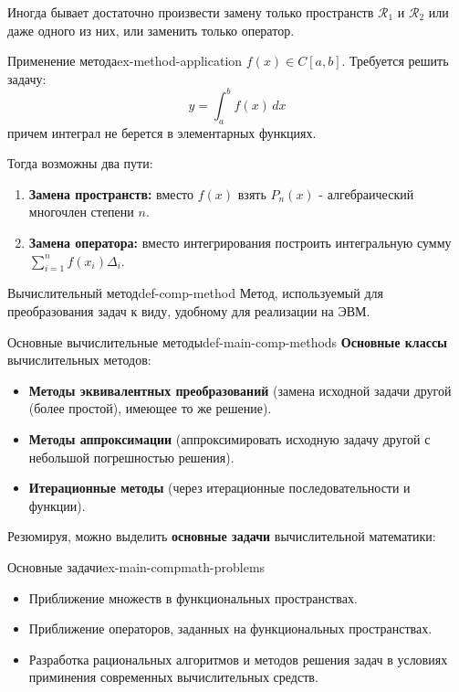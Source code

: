 \documentclass[14pt]{extarticle}
\begin{document}
        Иногда бывает достаточно произвести замену только пространств $\mathscr{R}_{1}$ и $\mathscr{R}_{2}$ или даже одного из них, или заменить только оператор.

        \begin{example}{Применение метода}{ex-method-application}
            $f(x) \in C[a, b]$. Требуется решить задачу:
            $$y = \int_{a}^{b} f(x) \, dx$$
            причем интеграл не берется в элементарных функциях.

            Тогда возможны два пути:
            \begin{enumerate}
                \item \textbf{Замена пространств:} вместо $f(x)$ взять $P_{n}(x)$ - алгебраический многочлен степени $n$.
                \item \textbf{Замена оператора:} вместо интегрирования построить интегральную сумму $\sum_{i=1}^{n}f(x_{i})\Delta_{i}$.
            \end{enumerate}
        \end{example}

        \begin{definition}{Вычислительный метод}{def-comp-method}
            Метод, используемый для преобразования задач к виду, удобному для реализации на ЭВМ.
        \end{definition}

        \begin{definition}{Основные вычислительные методы}{def-main-comp-methods}
            \textbf{Основные классы} вычислительных методов:
            \begin{itemize}
                \item \textbf{Методы эквивалентных преобразований} (замена исходной задачи другой (более простой), имеющее то же решение).
                \item \textbf{Методы аппроксимации} (аппроксимировать исходную задачу другой с небольшой погрешностью решения).
                \item \textbf{Итерационные методы} (через итерационные последовательности и функции).
            \end{itemize}

        \end{definition}

        Резюмируя, можно выделить \textbf{основные задачи} вычислительной математики:

        \begin{example}{Основные задачи}{ex-main-compmath-problems}
            \begin{itemize}
                \item Приближение множеств в функциональных пространствах.
                \item Приближение операторов, заданных на функциональных пространствах.
                \item Разработка рациональных алгоритмов и методов решения задач в условиях приминения современных вычислительных средств.
            \end{itemize}
        \end{example}
\end{document}
